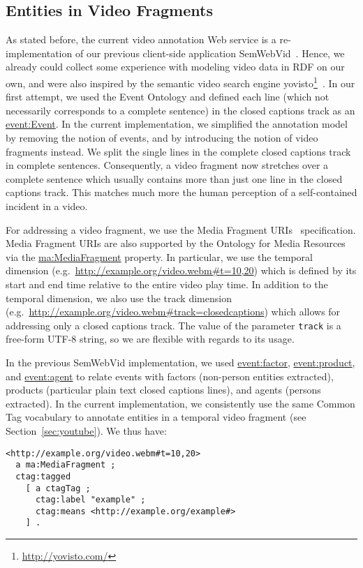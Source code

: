 \documentclass{acm_proc_article-sp}
\newcommand{\nofootnote}[1]{~#1}
\begin{document}
\subsection{Entities in Video Fragments}
As stated before, the current video annotation Web service is a re-implementation of our previous client-side
application SemWebVid~\cite{Steiner:SemWebVid}. Hence, we already could collect some experience with modeling video
data in RDF on our own, and were also inspired by the semantic video search engine
yovisto\footnote{\url{http://yovisto.com/}}~\cite{Sack:Use,Sack:VideoSearch}. In our first attempt, we used the Event
Ontology\cite{Raimond:Event} and defined each line (which not necessarily corresponds to a complete sentence) in the
closed captions track as an \url{event:Event}. In the current implementation, we simplified the annotation model by
removing the notion of events, and by introducing the notion of video fragments instead. We split the single lines in
the complete closed captions track in complete sentences. Consequently, a video fragment now stretches over a complete
sentence which usually contains more than just one line in the closed captions track. This matches much more the human
perception of a self-contained incident in a video.

For addressing a video fragment, we use the Media Fragment URIs~\cite{W3C:MediaFrags} specification. Media Fragment
URIs are also supported by the Ontology for Media Resources via the \url{ma:MediaFragment} property. In particular, we
use the temporal dimension (e.g.\nofootnote{\url{http://example.org/video.webm#t=10,20}}) which is defined by its start
and end time relative to the entire video play time. In addition to the temporal dimension, we also use the track
dimension (e.g.\nofootnote{\url{http://example.org/video.webm#track=closedcaptions}}) which allows for addressing only
a closed captions track. The value of the parameter \texttt{track} is a free-form UTF-8 string, so we are flexible with
regards to its usage.

In the previous SemWebVid implementation, we used \url{event:factor}, \url{event:product}, and \url{event:agent} to
relate events with factors (non-person entities extracted), products (particular plain text closed captions lines), and
agents (persons extracted). In the current implementation, we consistently use the same Common Tag vocabulary to
annotate entities in a temporal video fragment (see Section~\ref{sec:youtube}). We thus have:
\begin{lstlisting}
<http://example.org/video.webm#t=10,20>
  a ma:MediaFragment ;
  ctag:tagged
    [ a ctagTag ;
      ctag:label "example" ;
      ctag:means <http://example.org/example#>
    ] .
\end{lstlisting}
\end{document}
